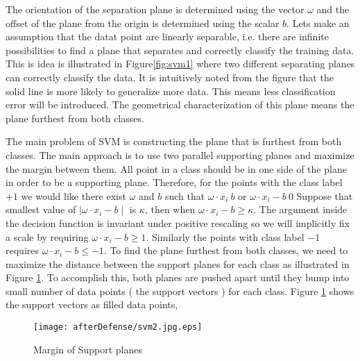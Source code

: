  The orientation of the separation plane is determined using the vector $\omega$ and the offset of the plane from the origin is determined using the scalar $b$.   Lets make an assumption that the datat point are linearly separable, i.e. there are infinite possibilities to find a plane that separates and correctly classify the training data. This is idea is illustrated in Figure\ref{fig:svm1} where two different separating planes can correctly classify the data. It is intuitively noted from the figure that the solid line is more likely to generalize more data. This means less classification error will be introduced. The geometrical characterization of this plane means the plane furthest from both classes.     %
 
The main problem of SVM is constructing the plane that is furthest from both classes. The main approach is to use two parallel supporting planes and maximize the margin between them. All point in a class should be in one side of the plane in order to be a supporting plane.  Therefore, for the points with the class label $+1$ we would like there exist $\omega$ and $b$ such that $\omega \cdot x_i\> b$ or $\omega \cdot x_i -b \> 0$%
Suppose that smallest value of $\mid \omega \cdot x_i -b\mid$ is $\kappa$, then when $ \omega \cdot x_i -b \geq \kappa$. The argument inside the decision function is invariant under positive rescaling so we will implicitly fix a scale by requiring $\omega \cdot x_i -b \geq 1 $. Similarly the points with class label $-1$ requires $\omega \cdot x_i -b \leq -1 $. To find the plane furthest from both classes, we need to maximize the distance between the support planes for each class as illustrated in Figure \ref{fig:svm2}. To accomplish this, both planes are pushed apart until they bump into small number of data points ( the support vectors ) for each class. Figure \ref{fig:svm2} shows the support vectors as filled data points, 
\begin{figure}
	\centering
		\texttt{[image: afterDefense/svm2.jpg.eps]}
	\caption{Margin of Support planes }
	\label{fig:svm2}
\end{figure}


